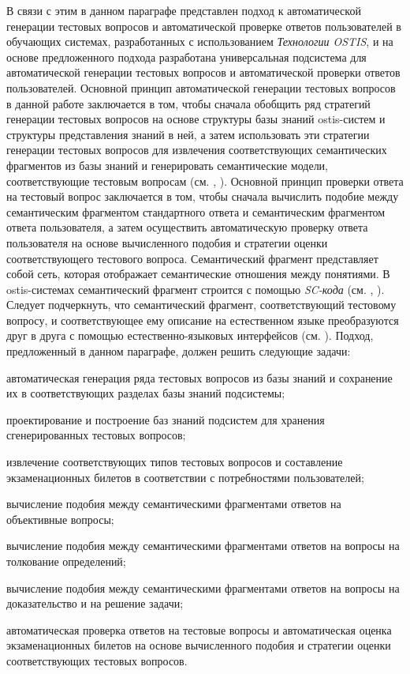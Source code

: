 В связи с этим в данном параграфе представлен подход к автоматической генерации тестовых вопросов и автоматической проверке ответов пользователей в обучающих системах, разработанных с использованием \textit{Технологии OSTIS}, и на основе предложенного подхода разработана универсальная подсистема для автоматической генерации тестовых вопросов и автоматической проверки ответов пользователей. Основной принцип автоматической генерации тестовых вопросов в данной работе заключается в том, чтобы сначала обобщить ряд стратегий генерации тестовых вопросов на основе структуры базы знаний ostis-систем и структуры представления знаний в ней, а затем использовать эти стратегии генерации тестовых вопросов для извлечения соответствующих семантических фрагментов из базы знаний и генерировать семантические модели, соответствующие тестовым вопросам (см. , ). Основной принцип проверки ответа на тестовый вопрос заключается в том, чтобы сначала вычислить подобие между семантическим фрагментом стандартного ответа и семантическим фрагментом ответа пользователя, а затем осуществить автоматическую проверку ответа пользователя на основе вычисленного подобия и стратегии оценки соответствующего тестового вопроса. Семантический фрагмент представляет собой сеть, которая отображает семантические отношения между понятиями. В ostis-системах семантический фрагмент строится с помощью \textit{SC-кода} (см. , ). Следует подчеркнуть, что семантический фрагмент, соответствующий тестовому вопросу, и соответствующее ему описание на естественном языке преобразуются друг в друга с помощью естественно-языковых интерфейсов (см. ). Подход, предложенный в данном параграфе, должен решить следующие задачи:

\begin{textitemize}
	\item автоматическая генерация ряда тестовых вопросов из базы знаний и сохранение их в соответствующих разделах базы знаний подсистемы;
	\item проектирование и построение баз знаний подсистем для хранения сгенерированных тестовых вопросов;
	\item извлечение соответствующих типов тестовых вопросов и составление экзаменационных билетов в соответствии с потребностями пользователей;
	\item вычисление подобия между семантическими фрагментами ответов на объективные вопросы;
	\item вычисление подобия между семантическими фрагментами ответов на вопросы на толкование определений;
	\item вычисление подобия между семантическими фрагментами ответов на вопросы на доказательство и на решение задачи;
	\item автоматическая проверка ответов на тестовые вопросы и автоматическая оценка экзаменационных билетов на основе вычисленного подобия и стратегии оценки соответствующих тестовых вопросов.
\end{textitemize}

